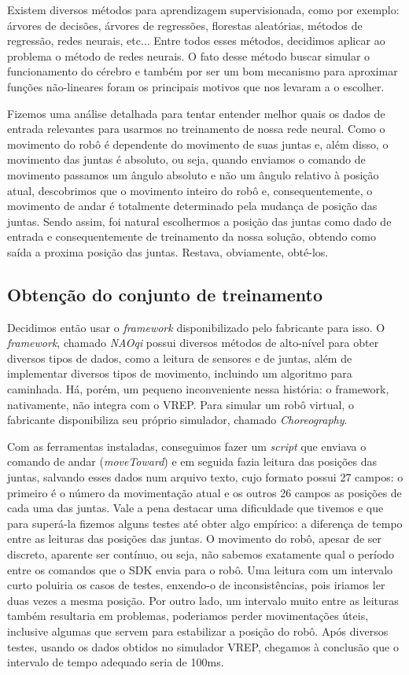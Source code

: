 \documentclass[twoside,conference,a4paper]{IEEEtran}
\begin{document}
Existem diversos métodos para aprendizagem supervisionada, como por exemplo: árvores de decisões, árvores de regressões, florestas aleatórias, métodos de regressão, redes neurais, etc... Entre todos esses métodos, decidimos aplicar ao problema o método de redes neurais. O fato desse método buscar simular o funcionamento do cérebro e também por ser um bom mecanismo para aproximar funções não-lineares foram os principais motivos que nos levaram a o escolher.

Fizemos uma análise detalhada para tentar entender melhor quais os dados de entrada relevantes para usarmos no treinamento de nossa rede neural. Como o movimento do robô é dependente do movimento de suas juntas e, além disso, o movimento das juntas é absoluto, ou seja, quando enviamos o comando de movimento passamos um ângulo absoluto e não um ângulo relativo à posição atual, descobrimos que o movimento inteiro do robô e, consequentemente, o movimento de andar é totalmente determinado pela mudança de posição das juntas. Sendo assim, foi natural escolhermos a posição das juntas como dado de entrada e consequentemente de treinamento da nossa solução, obtendo como saída a proxima posição das juntas. Restava, obviamente, obté-los.

\subsection{Obtenção do conjunto de treinamento}

Decidimos então usar o \textsl{framework} disponibilizado pelo fabricante para isso. O \textsl{framework}, chamado \textsl{NAOqi}\cite{naoqi} possui diversos métodos de alto-nível para obter diversos tipos de dados, como a leitura de sensores e de juntas, além de implementar diversos tipos de movimento, incluindo um algoritmo para caminhada. Há, porém, um pequeno inconveniente nessa história: o framework, nativamente, não integra com o VREP. Para simular um robô virtual, o fabricante disponibiliza seu próprio simulador, chamado \textsl{Choreography}.

Com as ferramentas instaladas, conseguimos fazer um \textsl{script} que enviava o comando de andar (\textsl{moveToward}) e em seguida fazia leitura das posições das juntas, salvando esses dados num arquivo texto, cujo formato possui 27 campos: o primeiro é o número da movimentação atual e os outros 26 campos as posições de cada uma das juntas. Vale a pena destacar uma dificuldade que tivemos e que para superá-la fizemos alguns testes até obter algo empírico: a diferença de tempo entre as leituras das posições das juntas. O movimento do robô, apesar de ser discreto, aparente ser contínuo, ou seja, não sabemos exatamente qual o período entre os comandos que o SDK envia para o robô. Uma leitura com um intervalo curto poluiria os casos de testes, enxendo-o de inconsistências, pois iriamos ler duas vezes a mesma posição. Por outro lado, um intervalo muito entre as leituras também resultaria em problemas, poderiamos perder movimentações úteis, inclusive algumas que servem para estabilizar a posição do robô. Após diversos testes, usando os dados obtidos no simulador VREP, chegamos à conclusão que o intervalo de tempo adequado seria de 100ms.
\end{document}
